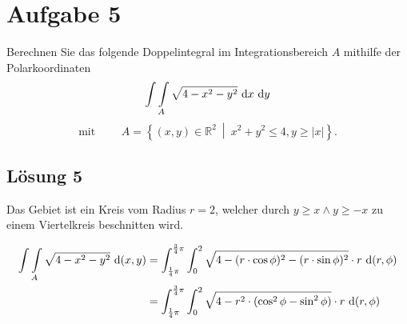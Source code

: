 \documentclass[main.tex]{subfiles}
\begin{document}
\section{Aufgabe 5}
Berechnen Sie das folgende Doppelintegral im Integrationsbereich $A$ mithilfe der Polarkoordinaten
\[
    \int \int \limits_{A} \sqrt{4 - x^2 - y^2} ~\mathrm{d}x ~\mathrm{d}y
\]
\[ 
\mbox{mit } \qquad 
    A = \left\{ (x,y) \in \mathbb{R}^2 \ \middle| \ x^2 + y^2 \leq 4, y \geq |x| \right\}.
\]

\subsection{Lösung 5}
Das Gebiet ist ein Kreis vom Radius $r=2$, welcher durch $y\geq x \land y \geq -x$ zu einem Viertelkreis beschnitten wird.

\begin{align*}
    \int \int \limits_{A} \sqrt{4 - x^2 - y^2} ~\mathrm{d}(x,y)
    &=
    \int_{\frac{1}{4}\pi}^{\frac{3}{4}\pi}
    \int_{0}^{2}
        \sqrt{4 - (r\cdot \cos \phi)^2 - (r\cdot \sin \phi)^2}
        \cdot r
    ~\mathrm{d}(r,\phi) \\
    &=
    \int_{\frac{1}{4}\pi}^{\frac{3}{4}\pi}
    \int_{0}^{2}
        \sqrt{4 - r^2\cdot (\cos^2 \phi - \sin^2 \phi)}
        \cdot r
    ~\mathrm{d}(r,\phi) \\
\end{align*}
\end{document}
